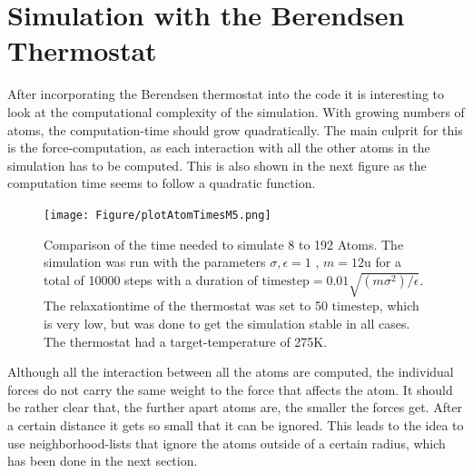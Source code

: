 \section{Simulation with the Berendsen Thermostat}

After incorporating the Berendsen thermostat into the code it is interesting to look at the computational complexity of the simulation. With growing numbers of atoms, the computation-time should grow quadratically. The main culprit for this is the force-computation, as each interaction with all the other atoms in the simulation has to be computed. This is also shown in the next figure as the computation time seems to follow a quadratic function. 
\begin{figure}
	\begin{center}
		\texttt{[image: Figure/plotAtomTimesM5.png]}
	\end{center}
	\caption[Comparison of the time needed to simulate 8 to 192 Atoms]{Comparison of the time needed to simulate 8 to 192 Atoms. The simulation was run with the parameters $\sigma, \epsilon = 1$ , $m = 12\mathrm{u}$ for a total of 10000 steps with a duration of $\mathrm{timestep} = 0.01\sqrt{(m\sigma^2)/\epsilon} $. The relaxationtime of the thermostat was set to 50 $\mathrm{timestep} $, which is very low, but was done to get the simulation stable in all cases. The thermostat had a target-temperature of 275K.} 
	\label{PlotSimulationTimeBerendsenThermostat}
\end{figure}
Although all the interaction between all the atoms are computed, the individual forces do not carry the same weight to the force that affects the atom. It should be rather clear that, the further apart atoms are, the smaller the forces get. After a certain distance it gets so small that it can be ignored. This leads to the idea to use neighborhood-lists that ignore the atoms outside of a certain radius, which has been done in the next section.


